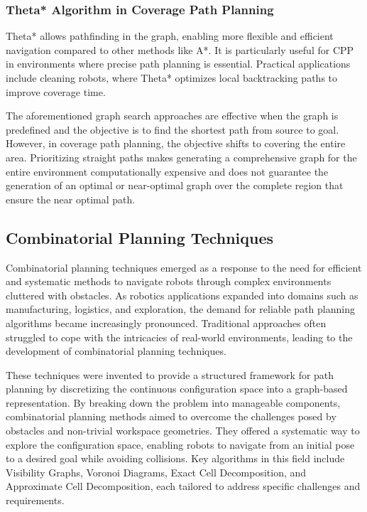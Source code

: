 \subsubsection{Theta* Algorithm in Coverage Path Planning}

Theta* allows pathfinding in the graph, enabling more flexible and efficient navigation compared to other methods like A*. It is particularly useful for CPP in environments where precise path planning is essential. Practical applications include cleaning robots, where Theta* optimizes local backtracking paths to improve coverage time.


\vspace{3mm} 
 
The aforementioned graph search approaches are effective when the graph is predefined and the objective is to find the shortest path from source to goal. However, in coverage path planning, the objective shifts to covering the entire area. Prioritizing straight paths makes generating a comprehensive graph for the entire environment computationally expensive  and does not guarantee the generation of an optimal or near-optimal graph over the complete region that ensure the near optimal path. 



\subsection{Combinatorial Planning Techniques}

Combinatorial planning techniques emerged as a response to the need for efficient and systematic
methods to navigate robots through complex environments cluttered with obstacles. As robotics
applications expanded into domains such as manufacturing, logistics, and exploration, the
demand for reliable path planning algorithms became increasingly pronounced. Traditional
approaches often struggled to cope with the intricacies of real-world environments, leading to
the development of combinatorial planning techniques.

\vspace{3mm} 
 

These techniques were invented to provide a structured framework for path planning by
discretizing the continuous configuration space into a graph-based representation. By breaking
down the problem into manageable components, combinatorial planning methods aimed to
overcome the challenges posed by obstacles and non-trivial workspace geometries. They offered a systematic way to explore the configuration space, enabling robots to navigate from an initial
pose to a desired goal while avoiding collisions. Key algorithms in this field include Visibility Graphs, Voronoi Diagrams, Exact Cell Decomposition, and Approximate Cell Decomposition, each tailored to address specific challenges and requirements.



